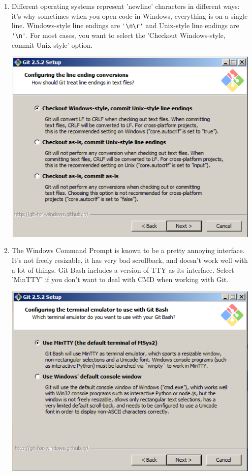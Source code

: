 \documentclass[11pt,fleqn]{article}
\theoremstyle{definition}
\begin{document}
\begin{enumerate}[Step 1.]
\item Different operating systems represent 'newline' characters in different ways: it's why sometimes when you open code in Windows, everything is on a single line. Windows-style line endings are \verb|'\n\r'| and Unix-style line endings are \verb|'\n'|. For most cases, you want to select the 'Checkout Windows-style, commit Unix-style' option.
\begin{center}
\includegraphics[scale=0.6]{gitwininstall3.png}
\end{center}

\item The Windows Command Prompt is known to be a pretty annoying interface. It's not freely resizable, it has very bad scrollback, and doesn't work well with a lot of things. Git Bash includes a version of TTY as its interface. Select 'MinTTY' if you don't want to deal with CMD when working with Git.
\begin{center}
\includegraphics[scale=0.6]{gitwininstall4.png}
\end{center}


\end{enumerate}
\end{document}
